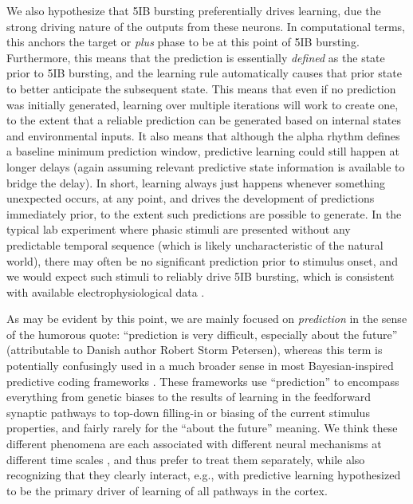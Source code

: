 \documentclass[11pt,twoside]{article}
\newif\myifpdf
\begin{document}
We also hypothesize that 5IB bursting preferentially drives learning, due the strong driving nature of the outputs from these neurons.  In computational terms, this anchors the target or \emph{plus} phase to be at this point of 5IB bursting.  Furthermore, this means that the prediction is essentially \emph{defined} as the state prior to 5IB bursting, and the learning rule automatically causes that prior state to better anticipate the subsequent state.  This means that even if no prediction was initially generated, learning over multiple iterations will work to create one, to the extent that a reliable prediction can be generated based on internal states and environmental inputs.  It also means that although the alpha rhythm defines a baseline minimum prediction window, predictive learning could still happen at longer delays (again assuming relevant predictive state information is available to bridge the delay).  In short, learning always just happens whenever something unexpected occurs, at any point, and drives the development of predictions immediately prior, to the extent such predictions are possible to generate.  In the typical lab experiment where phasic stimuli are presented without any predictable temporal sequence (which is likely uncharacteristic of the natural world), there may often be no significant prediction prior to stimulus onset, and we would expect such stimuli to reliably drive 5IB bursting, which is consistent with available electrophysiological data \citep{Bender82,PetersenRobinsonKeys85,BenderYouakim01,Robinson93,SaalmannPinskWangEtAl12,KomuraNikkuniHirashimaEtAl13,ZhouSchaferDesimone16}.

As may be evident by this point, we are mainly focused on \emph{prediction} in the sense of the humorous quote: ``prediction is very difficult, especially about the future'' (attributable to Danish author Robert Storm Petersen), whereas this term is potentially confusingly used in a much broader sense in most Bayesian-inspired predictive coding frameworks \citep{RaoBallard99,Friston05,deLangeHeilbronKok18}.  
These frameworks use ``prediction'' to encompass everything from genetic biases to the results of learning in the feedforward synaptic pathways to top-down filling-in or biasing of the current stimulus properties, and fairly rarely for the ``about the future'' meaning.   We think these different phenomena are each associated with different neural mechanisms at different time scales \citep{OReillyWyatteHerdEtAl13,OReillyMunakataFrankEtAl12}, and thus prefer to treat them separately, while also recognizing that they clearly interact, e.g., with predictive learning hypothesized to be the primary driver of learning of all pathways in the cortex.
\end{document}
